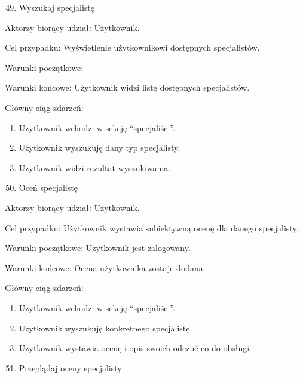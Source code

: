 {}

\begin{enumerate}
\setcounter{enumi}{48}
\tightlist
\item
  {Wyszukaj specjalistę}
\end{enumerate}

{Aktorzy biorący udział: Użytkownik.}

{Cel przypadku: Wyświetlenie użytkownikowi dostępnych specjalistów.}

{Warunki początkowe: -}

{Warunki końcowe: Użytkownik widzi listę dostępnych specjalistów.}

{Główny ciąg zdarzeń:}

\begin{enumerate}
\tightlist
\item
  {Użytkownik wchodzi w sekcję ``specjaliści''.}
\item
  {Użytkownik wyszukuję dany typ specjalisty.}
\item
  {Użytkownik widzi rezultat wyszukiwania.}
\end{enumerate}

{}

\begin{enumerate}
\setcounter{enumi}{49}
\tightlist
\item
  {Oceń specjalistę}
\end{enumerate}

{Aktorzy biorący udział: Użytkownik.}

{Cel przypadku: Użytkownik wystawia subiektywną ocenę dla danego
specjalisty.}

{Warunki początkowe: Użytkownik jest zalogowany.}

{Warunki końcowe: Ocena użytkownika zostaje dodana.}

{Główny ciąg zdarzeń:}

\begin{enumerate}
\tightlist
\item
  {Użytkownik wchodzi w sekcję ``specjaliści''.}
\item
  {Użytkownik wyszukuję konkretnego specjalistę.}
\item
  {Użytkownik wystawia ocenę i opis swoich odczuć co do obsługi.}
\end{enumerate}

{}

\begin{enumerate}
\setcounter{enumi}{50}
\tightlist
\item
  {Przeglądaj oceny specjalisty}
\end{enumerate}

